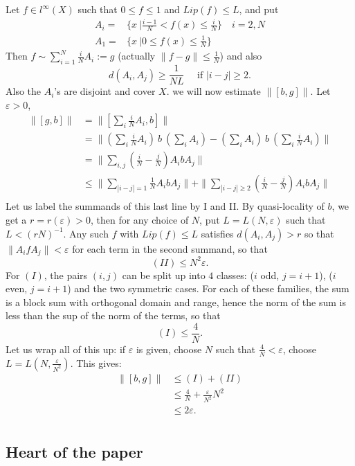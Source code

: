 Let $f\in l^\infty(X)$ such that $0\leq f \leq 1$ and $Lip(f)\leq L$, and put 
\[\begin{split}
A_i = &  \{x\ | \frac{i-1}{N} < f(x) \leq \frac{i}{N}\} \quad i=2,N \\ 
A_1 = & \{x \ |  0\leq f(x) \leq \frac{1}{N} \} \end{split} \] 
Then $f \sim \sum_{i=1}^N \frac{i}{N}A_i := g $ (actually $\| f-g\| \leq \frac{1}{N}$) and also 
\[ d(A_i,A_j)\geq \frac{1}{NL} \quad \text{ if } |i-j|\geq 2.\]
Also the $A_i$'s are disjoint and cover $X$. we will now estimate $\| [b,g] \| $. Let $\varepsilon>0$,
\[\begin{split}
\| [g,b] \| & = \| [ \sum_i \frac{i}{N} A_i , b] \| \\
		& = \| \left( \sum_i \frac{i}{N} A_i \right) \ b  \ \left(\sum_i  A_i \right)-  
				\left(\sum_i A_i \right) \ b \ \left(\sum_i \frac{i}{N} A_i \right) \| \\
		& = \| \sum_{i,j} ( \frac{i}{N} -\frac{j}{N}) A_i b A_j\| \\
		& \leq \| \sum_{|i-j| = 1} \frac{1}{N} A_i b A_j\| +\| \sum_{|i-j|\geq 2} (\frac{i}{N}-\frac{j}{N})A_i b A_j \| \\ 
\end{split}\]
Let us label the summands of this last line by I and II. By quasi-locality of $b$, we get a $r=r(\varepsilon)>0$, then for any choice of $N$, put $L= L(N,\varepsilon)$ such that $L< (rN)^{-1}$. Any such $f$ with $Lip(f)\leq L$ satisfies $d(A_i,A_j)> r$ so that $\| A_ifA_j \| < \varepsilon $ for each term in the second summand, so that 
\[ (II) \leq N^2 \varepsilon. \]
For $(I)$, the pairs $(i,j)$ can be split up into $4$ classes: ($i$ odd, $j = i+1$), ($i$ even, $j = i+1$) and the two symmetric cases. For each of these families, the sum is a block sum with orthogonal domain and range, hence the norm of the sum is less than the sup of the norm of the terms, so that 
\[(I) \leq \frac{4}{N}.\]
Let us wrap all of this up: if $\varepsilon$ is given, choose $N$ such that $\frac{4}{N} < \varepsilon$, choose $L= L(N,\frac{\varepsilon}{N^2})$. This gives:
\[\begin{split}
\| [b,g] \| & \leq (I) + (II) \\
	& \leq \frac{4}{N} + \frac{\varepsilon}{N^2} N^2 \\
	& \leq 2\varepsilon . \\
\end{split}\]   

\subsection{Heart of the paper}

